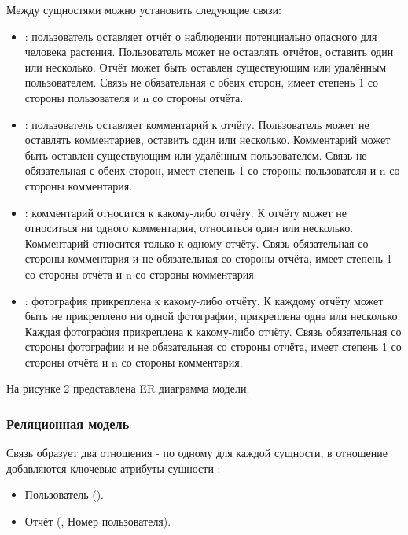 \tab
Между сущностями можно установить следующие связи:
\begin{itemize}
	\item {}: пользователь оставляет отчёт о наблюдении потенциально опасного для человека растения. Пользователь может не оставлять отчётов, оставить один или несколько. Отчёт может быть оставлен существующим или удалённым пользователем. Связь не обязательная с обеих сторон, имеет степень 1 со стороны пользователя и n со стороны отчёта.
	\item {}: пользователь оставляет комментарий к отчёту. Пользователь может не оставлять комментариев, оставить один или несколько. Комментарий может быть оставлен существующим или удалённым пользователем. Связь не обязательная с обеих сторон, имеет степень 1 со стороны пользователя и n со стороны комментария.
	\item {}: комментарий относится к какому-либо отчёту. К отчёту может не относиться ни одного комментария, относиться один или несколько. Комментарий относится только к одному отчёту. Связь обязательная со стороны комментария и не обязательная со стороны отчёта, имеет степень 1 со стороны отчёта и n со стороны комментария.
	\item {}: фотография прикреплена к какому-либо отчёту. К каждому отчёту может быть не прикреплено ни одной фотографии, прикреплена одна или несколько. Каждая фотография прикреплена к какому-либо отчёту. Связь обязательная со стороны фотографии и не обязательная со стороны отчёта, имеет степень 1 со стороны отчёта и n со стороны комментария.
\end{itemize}

\tab
На рисунке 2 представлена ER диаграмма модели.
\picturetwo

\subsubsection{Реляционная модель}

\tab
Связь  образует два отношения - по одному для каждой сущности, в отношение  добавляются ключевые атрибуты сущности :
\begin{itemize}
	\item Пользователь ().
	\item Отчёт (, Номер пользователя).
\end{itemize}

